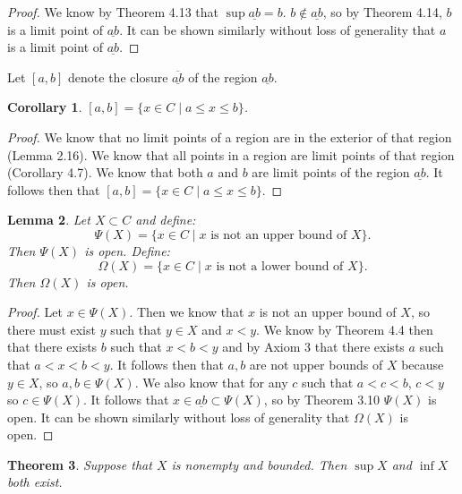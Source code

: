 \documentclass[12pt]{article}
\renewcommand{\_}[1]{\underline{ #1 }}
\newtheorem{theorem}{Theorem}[section]
\newtheorem{lemma}[theorem]{Lemma}
\newtheorem{corollary}[theorem]{Corollary}
\theoremstyle{definition}
\numberwithin{equation}{subsection}
\begin{document}
\begin{proof}
We know by Theorem 4.13 that $\sup \_{ab} = b$. $b \not \in \_{ab}$, so by Theorem 4.14, $b$ is a limit point of $\_{ab}$. It can be shown similarly without loss of generality that $a$ is a limit point of $\_{ab}$.
\end{proof}

Let $[a, b]$ denote the closure $\overline{\_{ab}}$ of the region $\_{ab}$.  

\begin{corollary}  $[a, b] = \{x \in C \mid a \leq x \leq b  \}$.
\end{corollary}

\begin{proof}
We know that no limit points of a region are in the exterior of that region (Lemma 2.16). We know that all points in a region are limit points of that region (Corollary 4.7). We know that both $a$ and $b$ are limit points of the region $\_{ab}$. It follows then that $[a,b] = \{x \in C \mid a \leq x \leq b\}$.
\end{proof}

\begin{lemma}  Let $X \subset C$ and define:
\[
\Psi(X) = \{ x \in C \mid \text{$x$ is not an upper bound of $X$} \}.
\]
Then $\Psi(X)$ is open.
Define:
\[
\Omega(X) = \{ x \in C \mid \text{$x$ is not a lower bound of $X$} \}.
\]
Then $\Omega(X)$ is open.
\end{lemma}

\begin{proof}
Let $x \in \Psi(X)$. Then we know that $x$ is not an upper bound of $X$, so there must exist $y$ such that $y \in X$ and $x < y$. We know by Theorem 4.4 then that there exists $b$ such that $x < b < y$ and by Axiom 3 that there exists $a$ such that $a < x < b < y$. It follows then that $a,b$ are not upper bounds of $X$ because $y \in X$, so $a,b \in \Psi(X)$. We also know that for any $c$ such that $a < c < b$, $c < y$ so $c \in \Psi(X)$. It follows that $x \in \_{ab} \subset \Psi(X)$, so by Theorem 3.10 $\Psi(X)$ is open. It can be shown similarly without loss of generality that $\Omega(X)$ is open.
\end{proof}

\begin{theorem}  Suppose that $X$ is nonempty and bounded.  Then $\sup X$ and $\inf X$ both exist.
\end{theorem}
\end{document}
